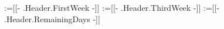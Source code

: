 \renewcommand\YEAR{\headerformat{YEAR}}
\renewcommand\MONTH{\headerformat{MONTH}}
\renewcommand\WEEK{\headerformat{WEEKNO}}

\makeatletter
\@for\ddd:={[[- .Header.FirstWeek -]]}%
\setlength{\fboxsep}{0pt}%
\@for\ddd:={[[- .Header.ThirdWeek -]]}%
    \@for\ddd:={[[- .Header.RemainingDays -]]}
\makeatother\\
\notelines
\fatline
\vspace{-.5em}
